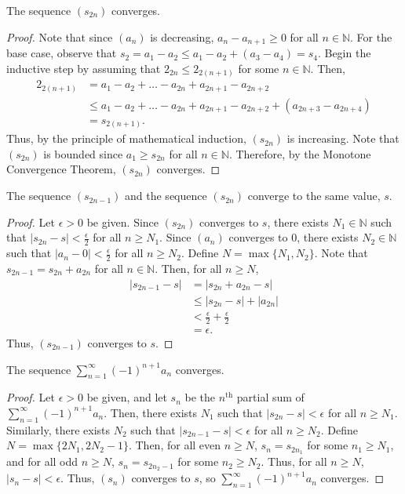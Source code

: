 \documentclass[12pt]{article}
\begin{document}
 The sequence $(s_{2n})$ converges.
\begin{proof}
    Note that since $(a_n)$ is decreasing, $a_n - a_{n+1} \geq 0$ for all $n \in \mathbb N$. For the base case, observe that $s_2 = a_1 - a_2  \leq a_1 - a_2 + (a_3 - a_4) = s_4$. Begin the inductive step by assuming that $2_{2n} \leq 2_{2(n+1)}$ for some $n \in \mathbb N$. Then,
    \begin{align*}
        2_{2(n+1)} &= a_1 - a_2 + \hdots - a_{2n} + a_{2n+1} - a_{2n+2} \\
                   &\leq a_1 - a_2 + \hdots - a_{2n} + a_{2n+1} - a_{2n+2} + (a_{2n+3} - a_{2n+4}) \\
                   &= s_{2(n+1)}.
    \end{align*}
    Thus, by the principle of mathematical induction, $(s_{2n})$ is increasing. Note that $(s_{2n})$ is bounded since $a_1 \geq s_{2n}$ for all $n \in \mathbb N$. Therefore, by the Monotone Convergence Theorem, $(s_{2n})$ converges.
\end{proof}

\medskip
{} The sequence $(s_{2n-1})$ and the sequence $(s_{2n})$ converge to the same value, $s$.
\begin{proof}
    Let $\epsilon > 0$ be given. Since $(s_{2n})$ converges to $s$, there exists $N_1 \in \mathbb N$ such that $|s_{2n} - s| < \frac\epsilon2$ for all $n \geq N_1$. Since $(a_n)$ converges to 0, there exists $N_2 \in \mathbb N$ such that $|a_n - 0| < \frac\epsilon2$ for all $n \geq N_2$. Define $N = \max\{N_1, N_2\}$. Note that $s_{2n-1} = s_{2n} + a_{2n}$ for all $n \in \mathbb N$. Then, for all $n \geq N$,
    \begin{align*}
        |s_{2n-1} - s| &= |s_{2n} + a_{2n} - s| \\
                       &\leq |s_{2n} - s| + |a_{2n}| \\
                       &< \frac\epsilon2 + \frac\epsilon2 \\
                       &= \epsilon.
    \end{align*} Thus, $(s_{2n-1})$ converges to $s$.
\end{proof}

\newpage
{} The sequence $\sum\limits_{n=1}^\infty (-1)^{n+1} a_n$ converges.
\begin{proof}
    Let $\epsilon > 0$ be given, and let $s_n$ be the $n^\text{th}$ partial sum of $\sum\limits_{n=1}^\infty (-1)^{n+1} a_n$. Then, there exists $N_1$ such that $|s_{2n} - s| < \epsilon$ for all $n \geq N_1$. Similarly, there exists $N_2$ such that $|s_{2n-1} - s| < \epsilon$ for all $n \geq N_2$. Define $N = \max\{2N_1, 2N_2-1\}$. Then, for all even $n \geq N$, $s_n = s_{2n_1}$ for some $n_1 \geq N_1$, and for all odd $n \geq N$, $s_n = s_{2n_2-1}$ for some $n_2 \geq N_2$. Thus, for all $n \geq N$, $|s_n - s| < \epsilon$. Thus, $(s_n)$ converges to $s$, so $\sum\limits_{n=1}^\infty (-1)^{n+1} a_n$ converges.
\end{proof}
\end{document}
